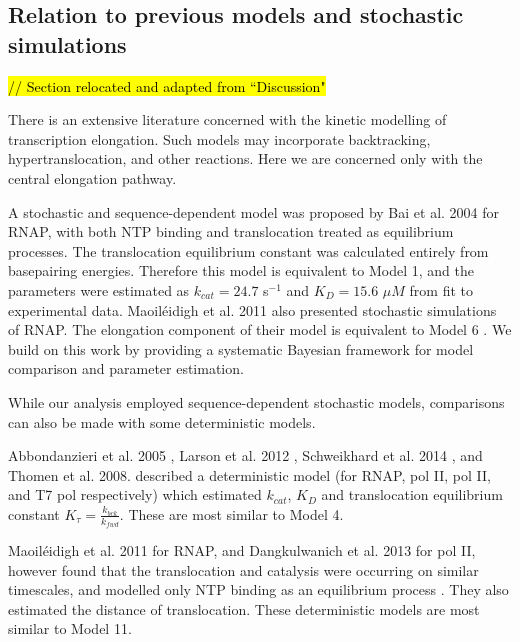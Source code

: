 \documentclass[10pt,letterpaper]{article}
\begin{document}
\subsection*{Relation to previous models and stochastic simulations}


\hl{// Section relocated and adapted from ``Discussion" }

There is an extensive literature concerned with the kinetic modelling of transcription elongation. Such models may incorporate backtracking, hypertranslocation, and other reactions. Here we are concerned only with the central elongation pathway.


A stochastic and sequence-dependent model  was proposed by Bai et al. 2004 \cite{bai2004sequence} for RNAP, with both NTP binding and translocation treated as equilibrium processes. The translocation equilibrium constant was calculated entirely from basepairing energies. Therefore this model is equivalent to Model 1, and the parameters were estimated as $k_{cat} = 24.7$ s$^{-1}$ and $K_D = 15.6$ $\mu M$ from fit to experimental data. Maoil{\'e}idigh et al. 2011 also presented stochastic simulations of RNAP. The elongation component of their model is equivalent to Model 6 \cite{maoileidigh2011unified}. We build on this work by providing a systematic Bayesian framework for model comparison and parameter estimation.   \par

While our analysis employed sequence-dependent stochastic models, comparisons can also be made with some deterministic models.


Abbondanzieri et al. 2005 \cite{abbondanzieri2005direct}, Larson et al. 2012 \cite{larson2012trigger} , Schweikhard et al. 2014 \cite{schweikhard2014transcription}, and Thomen et al. 2008. \cite{thomen2008t7, thomen2005unravelling}  described a deterministic model (for RNAP, pol II, pol II, and T7 pol respectively) which estimated $k_{cat}$, $K_D$ and translocation equilibrium constant $K_\tau = \frac{k_{bck}}{k_{fwd}}$. These are most similar to Model 4.




Maoil{\'e}idigh et al. 2011 for RNAP, and Dangkulwanich et al. 2013 for pol II, however found that the translocation and catalysis were occurring on similar timescales, and modelled only NTP binding as an equilibrium process  \cite{maoileidigh2011unified, Dangkulwanich2013complete}. They also estimated the distance of translocation. These deterministic models are most similar to Model 11.
\end{document}
